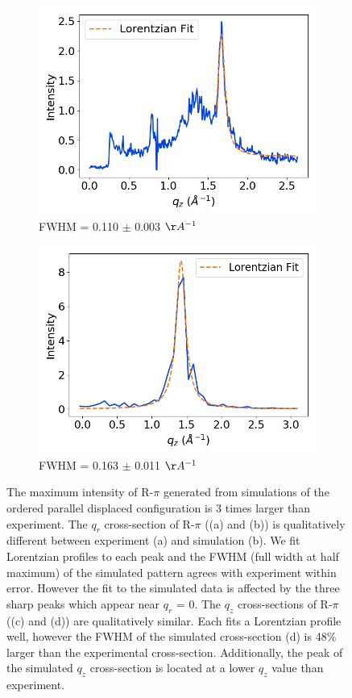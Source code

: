 \documentclass[journal=jpcbfk,manuscript=article]{achemso}
\begin{document}
\begin{figure}
\begin{subfigure}{0.45\textwidth}
  \includegraphics[width=\textwidth]{exp_zsection_fit.png}
  \caption{FWHM = 0.110 $\pm$ 0.003 $\AA^{-1}$}\label{fig:exp_zsection_fit}
  \end{subfigure}
  \begin{subfigure}{0.45\textwidth}
  \includegraphics[width=\textwidth]{sim_zsection_fit.png}
  \caption{FWHM = 0.163 $\pm$ 0.011 $\AA^{-1}$}\label{fig:sim_zsection_fit}
  \end{subfigure}
  \caption{
  The maximum intensity of R-$\pi$ generated from simulations of the ordered
  parallel displaced configuration is 3 times larger than experiment. The $q_r$
  cross-section of R-$\pi$ ((a) and (b)) is qualitatively different between 
  experiment (a) and simulation (b). We fit Lorentzian profiles to each peak and
  the FWHM (full width at half maximum) of the simulated pattern agrees with experiment within error. However
  the fit to the simulated data is affected by the three sharp peaks which appear
  near $q_r$ = 0. The $q_z$ cross-sections of R-$\pi$ ((c) and (d)) are 
  qualitatively similar. Each fits a Lorentzian profile well, however the FWHM
  of the simulated cross-section (d) is 48\% larger than the experimental 
  cross-section. Additionally, the peak of the simulated $q_z$ cross-section is 
  located at a lower $q_z$ value than experiment.}\label{fig:rpi_exp_comparison}
  \end{figure}
  
\end{document}
